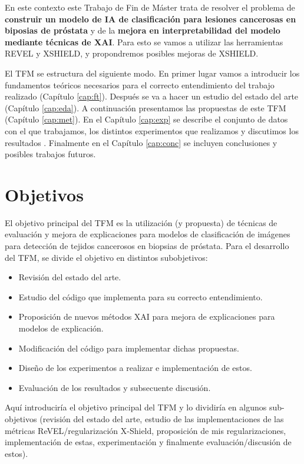 En este contexto este Trabajo de Fin de Máster trata de resolver el problema de \textbf{construir un modelo de IA de clasificación para lesiones cancerosas en biposias de próstata} y de la \textbf{mejora en interpretabilidad del modelo mediante técnicas de XAI}. Para esto se vamos a utilizar las herramientas REVEL y XSHIELD, y propondremos posibles mejoras de XSHIELD.


El TFM se estructura del siguiente modo. En primer lugar vamos a introducir los fundamentos teóricos necesarios para el correcto entendimiento del trabajo realizado (Capítulo \ref{cap:ft}). Después se va a hacer un estudio del estado del arte (Capítulo \ref{cap:eda}). A continuación presentamos las propuestas de este TFM (Capítulo \ref{cap:met}). En el Capítulo \ref{cap:exp} se describe el conjunto de datos con el que trabajamos, los distintos experimentos que realizamos y discutimos los resultados . Finalmente en el Capítulo \ref{cap:conc} se incluyen conclusiones y posibles trabajos futuros.


\section{Objetivos}

El objetivo principal del TFM es la utilización (y propuesta) de técnicas de evaluación y mejora de explicaciones  para modelos de clasificación de imágenes para detección de tejidos cancerosos en biopsias de próstata. Para el desarrollo del TFM, se divide el objetivo en distintos subobjetivos:

\begin{itemize}
\item Revisión del estado del arte.
\item Estudio del código que implementa \cite{REVEL, XSHIELD} para su correcto entendimiento.
\item Proposición de nuevos métodos XAI para mejora de explicaciones para modelos de explicación.
\item Modificación del código para implementar dichas propuestas.
\item Diseño de los experimentos a realizar e implementación de estos.
\item Evaluación de los resultados y subsecuente discusión.
\end{itemize}

Aquí introduciría el objetivo principal del TFM y lo dividiría en algunos sub-objetivos (revisión del estado del arte, estudio de las implementaciones de las métricas ReVEL/regularización X-Shield, proposición de mis regularizaciones, implementación de estas, experimentación y finalmente evaluación/discusión de estos). 



